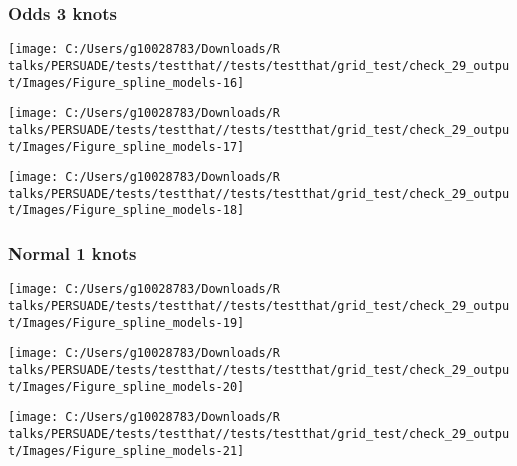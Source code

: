\documentclass[
]{article}
\begin{document}
\clearpage

\subsubsection{Odds 3 knots}\label{odds-3-knots}

\begin{flushleft}\texttt{[image: C:/Users/g10028783/Downloads/R talks/PERSUADE/tests/testthat//tests/testthat/grid\_test/check\_29\_output/Images/Figure\_spline\_models-16]} \end{flushleft}

\begin{flushleft}\texttt{[image: C:/Users/g10028783/Downloads/R talks/PERSUADE/tests/testthat//tests/testthat/grid\_test/check\_29\_output/Images/Figure\_spline\_models-17]} \end{flushleft}

\begin{flushleft}\texttt{[image: C:/Users/g10028783/Downloads/R talks/PERSUADE/tests/testthat//tests/testthat/grid\_test/check\_29\_output/Images/Figure\_spline\_models-18]} \end{flushleft}

\clearpage

\subsubsection{Normal 1 knots}\label{normal-1-knots}

\begin{flushleft}\texttt{[image: C:/Users/g10028783/Downloads/R talks/PERSUADE/tests/testthat//tests/testthat/grid\_test/check\_29\_output/Images/Figure\_spline\_models-19]} \end{flushleft}

\begin{flushleft}\texttt{[image: C:/Users/g10028783/Downloads/R talks/PERSUADE/tests/testthat//tests/testthat/grid\_test/check\_29\_output/Images/Figure\_spline\_models-20]} \end{flushleft}

\begin{flushleft}\texttt{[image: C:/Users/g10028783/Downloads/R talks/PERSUADE/tests/testthat//tests/testthat/grid\_test/check\_29\_output/Images/Figure\_spline\_models-21]} \end{flushleft}

\clearpage
\end{document}
